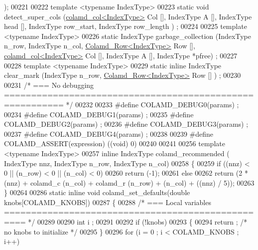 \begin{DoxyCode}
       []);
00221 
00222 \textcolor{keyword}{template} <\textcolor{keyword}{typename} IndexType>
00223 \textcolor{keyword}{static} \textcolor{keywordtype}{void} detect\_super\_cols (\hyperlink{structinternal_1_1colamd__col}{colamd\_col<IndexType>} Col [], IndexType A [], IndexType
       head [], IndexType row\_start, IndexType row\_length ) ;
00224 
00225 \textcolor{keyword}{template} <\textcolor{keyword}{typename} IndexType>
00226 \textcolor{keyword}{static} IndexType garbage\_collection (IndexType n\_row, IndexType n\_col, 
      \hyperlink{structinternal_1_1_colamd___row}{Colamd\_Row<IndexType>} Row [], \hyperlink{structinternal_1_1colamd__col}{colamd\_col<IndexType>} Col [], 
      IndexType A [], IndexType *pfree) ;
00227 
00228 \textcolor{keyword}{template} <\textcolor{keyword}{typename} IndexType>
00229 \textcolor{keyword}{static} \textcolor{keyword}{inline}  IndexType clear\_mark (IndexType n\_row, \hyperlink{structinternal_1_1_colamd___row}{Colamd\_Row<IndexType>} Row [] ) ;
00230 
00231 \textcolor{comment}{/* === No debugging ========================================================= */}
00232 
00233 \textcolor{preprocessor}{#define COLAMD\_DEBUG0(params) ;}
00234 \textcolor{preprocessor}{#define COLAMD\_DEBUG1(params) ;}
00235 \textcolor{preprocessor}{#define COLAMD\_DEBUG2(params) ;}
00236 \textcolor{preprocessor}{#define COLAMD\_DEBUG3(params) ;}
00237 \textcolor{preprocessor}{#define COLAMD\_DEBUG4(params) ;}
00238 
00239 \textcolor{preprocessor}{#define COLAMD\_ASSERT(expression) ((void) 0)}
00240 
00241 
00256 \textcolor{keyword}{template} <\textcolor{keyword}{typename} IndexType>
00257 \textcolor{keyword}{inline} IndexType colamd\_recommended ( IndexType nnz, IndexType n\_row, IndexType n\_col)
00258 \{
00259   \textcolor{keywordflow}{if} ((nnz) < 0 || (n\_row) < 0 || (n\_col) < 0)
00260     \textcolor{keywordflow}{return} (-1);
00261   \textcolor{keywordflow}{else}
00262     \textcolor{keywordflow}{return} (2 * (nnz) + colamd\_c (n\_col) + colamd\_r (n\_row) + (n\_col) + ((nnz) / 5)); 
00263 \}
00264 
00286 \textcolor{keyword}{static} \textcolor{keyword}{inline} \textcolor{keywordtype}{void} colamd\_set\_defaults(\textcolor{keywordtype}{double} knobs[COLAMD\_KNOBS])
00287 \{
00288   \textcolor{comment}{/* === Local variables ================================================== */}
00289   
00290   \textcolor{keywordtype}{int} i ;
00291 
00292   \textcolor{keywordflow}{if} (!knobs)
00293   \{
00294     return ;      \textcolor{comment}{/* no knobs to initialize */}
00295   \}
00296   \textcolor{keywordflow}{for} (i = 0 ; i < COLAMD\_KNOBS ; i++)

\end{DoxyCode}
